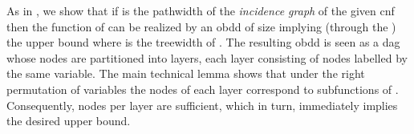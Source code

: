 \documentclass{article}
\begin{document}
As in \cite{VardiTWD}, we show that if  is the pathwidth of the
\emph{incidence graph}  of the given {\sc cnf}  then the function of 
can be realized by an {\sc obdd} of size  implying (through the ) the
 upper bound where  is the treewidth of . The resulting {\sc obdd} is seen 
as a {\sc dag} whose nodes are partitioned into layers, each layer consisting of nodes labelled
by the same variable. The main technical lemma shows that under the right permutation of variables
the nodes of each layer correspond to  subfunctions of . Consequently, 
nodes per layer are sufficient, which in turn, immediately implies the desired upper bound.

\begin{comment}
This upper bound is stronger than 
the one provided in \cite{VardiTWD} for the primal graph because, on the one hand, there are classes 
of {\sc cnf}s (e.g. containing one big clause) with a small treewidth of the incidence graph and 
an unbounded treewidth of the primal graph and, on the other hand, the treewidth of the incidence graph 
is at most as the treewidth of the primal graph plus one. Indeed, for each clause  there 
is a bag of the tree decomposition of the primal graph 
containing all the variables of . Hence, we just create a new leaf connected to the node of this bag
and put into this leaf the clause  and all its variables. Due to the latter reason the lower bound
proved in the previous section holds for the parameterization by the treewidth of the incidence graph.
\end{comment}
\begin{comment}
We also show that the  upper bound cannot be extended to the case where the function to be
realized as an {\sc obdd} is represented by a circuit of width  due to existence of a class of circuit
for which the equivalent {\sc obdd} is of size at least  for some constant . It is interesting
to notice that  a well-known Tseitin transformation converts the given circuit  into a {\sc cnf}  with 
at most a linear treewidth increase (see e.g. \cite{RazPet}). Consequently, 
can be compiled into an {\sc obdd} of size . However,  contains variables that do not occur
in  and it is the elimination of these variables that causes the exponential gap between 
and . The exponential explosion of the {\sc obdd} size caused by elimination of variables
has been observed earlier in \cite{VardiTWD}. However, the combination of the results of this section shows
that a more \emph{specific} elimination of variables, namely of those that are introduced by the Tseitin
transformation explodes the {\sc obdd} size as well.
\end{comment}
\end{document}
